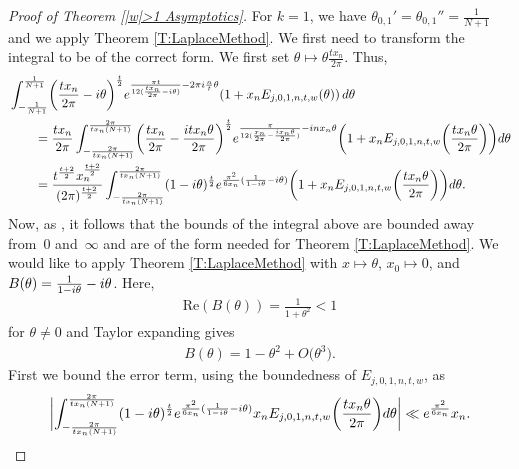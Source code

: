 \documentclass[11pt]{article}
\numberwithin{equation}{section}
\def\lp{\left(}
\def\rp{\right)}
\begin{document}
\begin{proof}[Proof of Theorem \ref{|w|>1 Asymptotics}]
For $k=1$, we have $\theta_{0,1}'=\theta_{0,1}''=\frac{1}{N+1}$ and we apply Theorem \ref{T:LaplaceMethod}.
We first need to transform the integral to be of the correct form. We first set $\theta \mapsto \theta \frac{tx_n}{2\pi}$. Thus,
\begin{align}
 &\int_{-\frac{1}{N+1}}^{\frac{1}{N+1}} \biggl(\frac{tx_n}{2\pi}-{\rm i}\theta\biggr)^{\frac{t}{2}}{\rm e}^{\frac{\pi t}{12(\frac{tx_n}{2\pi}-{\rm i}\theta)}-2\pi {\rm i} \frac{n}{t} \theta} (1+x_n E_{j,0,1,n,t,w}(\theta)) \,{\rm d}\theta \nonumber \\
 &\qquad{}=\frac{tx_n}{2\pi}\int_{-\frac{2\pi}{tx_n(N+1)}}^{\frac{2\pi}{tx_n(N+1)}} \biggl(\frac{tx_n}{2\pi}-\frac{{\rm i}tx_n\theta}{2\pi}\biggr)^{\frac{t}{2}}{\rm e}^{\frac{\pi}{12(\frac{x_n}{2\pi}-\frac{{\rm i}x_n\theta}{2\pi})}- {\rm i} nx_n \theta} \biggl(1+x_n E_{j,0,1,n,t,w}\biggl(\frac{tx_n\theta}{2\pi}\biggr)\biggr) {\rm d}\theta \nonumber \\
 &\qquad{}=\frac{t^{\frac{t+2}{2}}x_n^{\frac{t+2}{2}}}{(2\pi)^{\frac{t+2}{2}}}\int_{-\frac{2\pi}{tx_n(N+1)}}^{\frac{2\pi}{tx_n(N+1)}} (1-{\rm i}\theta)^{\frac{t}{2}}{\rm e}^{\frac{\pi^2}{6x_n}( \frac{1}{1-{\rm i}\theta}- {\rm i} \theta)} \biggl(1+x_n E_{j,0,1,n,t,w}\biggl(\frac{tx_n\theta}{2\pi}\biggr)\biggr) {\rm d}\theta. \label{E:MainRewrite}
\end{align}
Now, as , it follows that the bounds of the integral above are bounded away from~0 and~$\infty$ and are of the form needed for Theorem \ref{T:LaplaceMethod}. We would like to apply Theorem \ref{T:LaplaceMethod} with $x\mapsto \theta$, $x_0\mapsto 0$,  and $B(\theta)=\frac{1}{1-{\rm i}\theta}- {\rm i} \theta$. Here,
\begin{align*}
 \mathrm{Re} \lp B(\theta) \rp = \frac{1}{1+\theta^2}< 1
\end{align*}
for $\theta \neq 0$ and Taylor expanding gives
\begin{align*}
 B(\theta)=1-\theta^2+O\big(\theta^3\big).
\end{align*}
First we bound the error term, using the boundedness of $E_{j,0,1,n,t,w}$, as
\begin{equation}\label{E:MainTerm}
\biggl|\int_{-\frac{2\pi}{tx_n(N+1)}}^{\frac{2\pi}{tx_n(N+1)}} (1-{\rm i}\theta)^{\frac{t}{2}}{\rm e}^{\frac{\pi^2}{6x_n}( \frac{1}{1-{\rm i}\theta}- {\rm i}\theta)} x_n E_{j,0,1,n,t,w}\biggl(\frac{tx_n\theta}{2\pi}\biggr) {\rm d}\theta \biggr| \ll {\rm e}^{\frac{\pi^2}{6x_n}}x_n.
\end{equation}

\end{proof}
\end{document}

